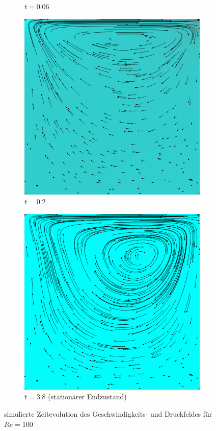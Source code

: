 \begin{figure}[!htb]
\begin{subfigure}[b]{.5\textwidth}
				\caption{$t=0.06$}
				\label{fig:time 02}
			\end{subfigure}
			\begin{subfigure}[b]{.5\textwidth}
				\center
				\includegraphics[scale = 0.28]{screenshots/time-0200.png}
				\caption{$t=0.2$}
				\label{fig:time 03}
			\end{subfigure}
			\begin{subfigure}[b]{.5\textwidth}
				\center
				\includegraphics[scale = 0.28]{screenshots/time-3800.png}
				\caption{$t=3.8$ (stationärer Endzustand)}
				\label{fig:time 04}
			\end{subfigure}
			\caption{simulierte Zeitevolution des Geschwindigkeits- und Druckfeldes für $Re = 100$}
			\label{fig:time evolution}
		\end{figure}

